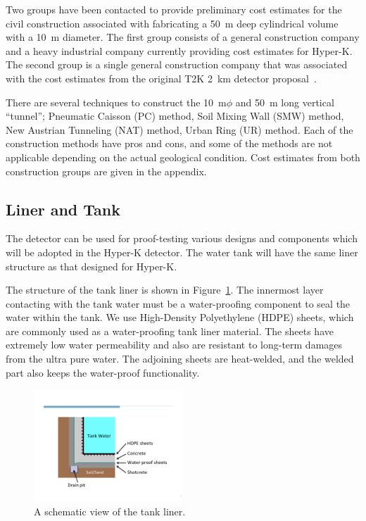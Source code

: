 
Two groups have been contacted to provide preliminary cost estimates for the civil construction associated with fabricating a 50~m deep cylindrical volume with a 10~m diameter. The first group consists of a general construction company and a heavy industrial company currently providing cost estimates for Hyper-K. The second group is a single general construction company that was associated with the cost estimates from the original T2K 2~km detector proposal~\cite{t2k2km}.

There are several techniques to construct the 10~m$\phi$ and 50~m long vertical ``tunnel'';
Pneumatic Caisson (PC) method, Soil Mixing Wall (SMW) method, New Austrian Tunneling (NAT)
method, Urban Ring (UR) method.
Each of the construction methods have pros and cons, and some of the methods are not applicable
depending on the actual geological condition. Cost estimates from both construction groups are given in the appendix.

\subsection{Liner and Tank}

The \nuprism detector can be used for proof-testing various designs and components which
will be adopted in the Hyper-K detector. The \nuprism water tank will
have the same liner structure as that designed for Hyper-K.

The structure of the \nuprism tank liner is shown in Figure~\ref{fig:liner}. The innermost layer
contacting with the tank water must be a water-proofing component to seal the water within
the tank. We use High-Density Polyethylene (HDPE) sheets, which are commonly used as a
water-proofing tank liner material. The sheets have extremely low water permeability and also
are resistant to long-term damages from the ultra pure water. The adjoining sheets are
heat-welded, and the welded part also keeps the water-proof functionality.
%
\begin{figure}[htpb]
  \centering
  \includegraphics[width=0.5\textwidth]{figures/nuPRISM_liner}
  \caption{A schematic view of the \nuprism tank liner.}
  \label{fig:liner}
\end{figure}

